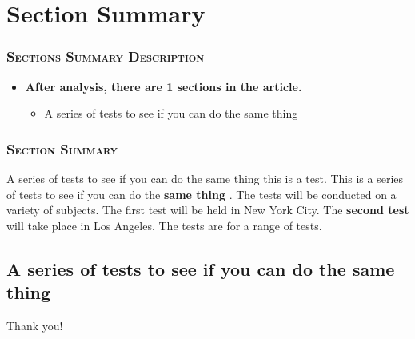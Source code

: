 \documentclass{beamer}%
\begin{document}
\section{Section Summary}%
\begin{frame}%
\frametitle{\textsc{Sections Summary Description}}%
\begin{itemize}%
\item{\bf{After analysis, there are 1 sections in the article.}}%
\begin{itemize}%
\item{A series of tests to see if you can do the same thing}%
\end{itemize}%
\end{itemize}%
\end{frame}%
\begin{frame}%
\frametitle{\textsc{Section Summary}}%
\begin{block}{A series of tests to see if you can do the same thing}%
this is a test. This is a series of tests to see if you can do the %
\textbf{same thing}%
. The tests will be conducted on a variety of subjects. The first test will be held in New York City. The %
\textbf{second test}%
 will take place in Los Angeles.    The tests are for a range of tests.%
\end{block}%
\subsection{A series of tests to see if you can do the same thing}%
\end{frame}%
\begin{frame}%
\Huge{\centerline{Thank you!}}%
\end{frame}%
\end{document}
